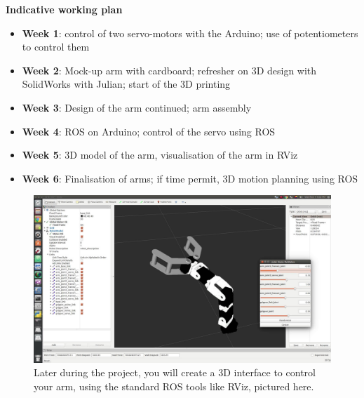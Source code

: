 \documentclass{instructions}
\begin{document}

\vspace{2em}
\textbf{Indicative working plan}

\begin{itemize}
    \item \textbf{Week 1}:  control of two servo-motors with the Arduino; use of 
        potentiometers to control them
    \item \textbf{Week 2}: Mock-up arm with cardboard; refresher on 3D design
        with SolidWorks with Julian; start of the 3D printing
    \item \textbf{Week 3}: Design of the arm continued; arm assembly
    \item \textbf{Week 4}: ROS on Arduino; control of the servo using ROS
    \item \textbf{Week 5}: 3D model of the arm, visualisation of the arm in RViz
    \item \textbf{Week 6}: Finalisation of arms; if time permit, 3D motion
        planning using ROS
\end{itemize}

\begin{figure}
    \centering
    \includegraphics[width=0.9\linewidth]{servo-rviz}
    \caption{Later during the project, you will create a 3D interface to control
    your arm, using the standard ROS tools like RViz, pictured here.}
    \label{}
\end{figure}

\pagebreak

~

\end{document}
